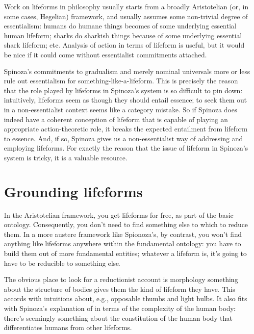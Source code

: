 \documentclass{article}
\newcommand{\dash}{\unskip{—}}
\begin{document}
Work on lifeforms in philosophy usually starts from a broadly Aristotelian (or, in some cases, Hegelian) framework, and usually assumes some non-trivial degree of essentialism: humans do humane things becomes of some underlying essential human lifeform; sharks do sharkish things because of some underlying essential shark lifeform; etc. Analysis of action in terms of lifeform is useful, but it would be nice if it could come without essentialist commitments attached.

Spinoza's commitments to gradualism and merely nominal universals more or less rule out essentialism for something-like-a-lifeform. This is precisely the reason that the role played by lifeforms in Spinoza's system is so difficult to pin down: intuitively, lifeforms seem as though they should entail essence; to seek them out in a non-essentialist context seems like a category mistake. So if Spinoza does indeed have a coherent conception of lifeform that is capable of playing an appropriate action-theoretic role, it breaks the expected entailment from lifeform to essence. And, if so, Spinoza gives us a non-essentialist way of addressing and employing lifeforms. For exactly the reason that the issue of lifeform in Spinoza's system is tricky, it is a valuable resource.

\section{Grounding lifeforms}\label{sec:GroundingLifeforms}

In the Aristotelian framework, you get lifeforms for free, as part of the basic ontology. Consequently, you don't need to find something else to which to reduce them. In a more austere framework like Spionoza's, by contrast, you won't find anything like lifeforms anywhere within the fundamental ontology: you have to build them out of more fundamental entities; whatever a lifeform is, it's going to have to be reducible to something else.

The obvious place to look for a reductionist account is morphology \dash something about the structure of bodies gives them the kind of lifeform they have. This accords with intuitions about, e.g., opposable thumbs and light bulbs. It also fits with Spinoza's explanation of  in terms of the complexity of the human body: there's seemingly something about the constitution of the human body that differentiates humans from other lifeforms.
\end{document}
